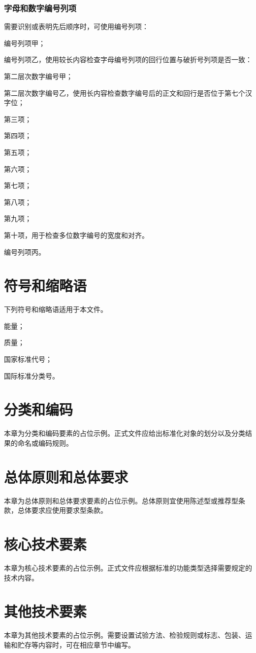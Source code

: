 \subsection{字母和数字编号列项}
需要识别或表明先后顺序时，可使用编号列项：
\begin{stdenum}
    \item 编号列项甲；
    \item 编号列项乙，使用较长内容检查字母编号列项的回行位置与破折号列项是否一致：
    \begin{stdenum}
        \item 第二层次数字编号甲；
        \item 第二层次数字编号乙，使用长内容检查数字编号后的正文和回行是否位于第七个汉字位；
        \item 第三项；
        \item 第四项；
        \item 第五项；
        \item 第六项；
        \item 第七项；
        \item 第八项；
        \item 第九项；
        \item 第十项，用于检查多位数字编号的宽度和对齐。
    \end{stdenum}
    \item 编号列项丙。
\end{stdenum}

\chapter{符号和缩略语}
下列符号和缩略语适用于本文件。
\begin{stdsymbols}
    \item[$E$] 能量；
    \item[$m$] 质量；
    \item[GB] 国家标准代号；
    \item[ICS] 国际标准分类号。
\end{stdsymbols}

\chapter{分类和编码}
本章为分类和编码要素的占位示例。正式文件应给出标准化对象的划分以及分类结果的命名或编码规则。

\chapter{总体原则和总体要求}
本章为总体原则和总体要求要素的占位示例。总体原则宜使用陈述型或推荐型条款，总体要求应使用要求型条款。

\chapter{核心技术要素}
本章为核心技术要素的占位示例。正式文件应根据标准的功能类型选择需要规定的技术内容。

\chapter{其他技术要素}
本章为其他技术要素的占位示例。需要设置试验方法、检验规则或标志、包装、运输和贮存等内容时，可在相应章节中编写。
